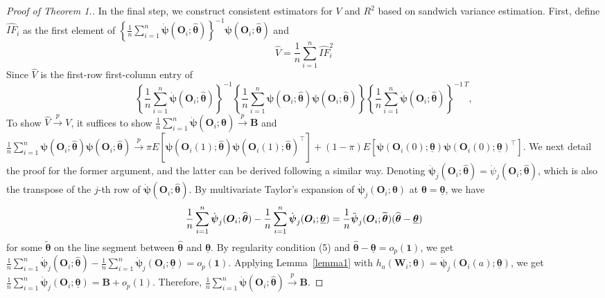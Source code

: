 \documentclass[12pt]{article}
\newcommand{\bO}{\boldsymbol{O}}
\newcommand{\bW}{\boldsymbol{W}}
\newcommand{\bone}{\boldsymbol{1}}
\newcommand{\btheta}{\boldsymbol{\theta}}
\newcommand{\bpsi}{\boldsymbol{\psi}}
\newcommand{\bfB}{\mathbf{B}}
\begin{document}
\begin{proof}[Proof of Theorem 1.]
In the final step, we construct consistent estimators for $V$ and $R^2$ based on sandwich variance estimation. First, define $\widehat{IF}_i$ as the first element of $\left\{ \frac{1}{n}\sum_{i=1}^n \dot{\bpsi}(\bO_i; \widehat{\btheta}) \right\}^{-1} \bpsi(\bO_i; \widehat{\btheta})$ and
\begin{equation}\label{def: vhat}
    \widehat{V} = \frac{1}{n}\sum_{i=1}^n \widehat{IF}_i^2
\end{equation}
Since $\widehat{V}$ is the first-row first-column entry of 
\begin{equation*}
   \left\{ \frac{1}{n}\sum_{i=1}^n \dot{\bpsi}(\bO_i; \widehat{\btheta}) \right\}^{-1} \left\{\frac{1}{n}\sum_{i=1}^n \bpsi(\bO_i; \widehat{\btheta})\bpsi(\bO_i; \widehat{\btheta})\right\}\left\{ \frac{1}{n}\sum_{i=1}^n \dot{\bpsi}(\bO_i; \widehat{\btheta}) \right\}^{-1\ T},
\end{equation*}
To show $\widehat{V} \xrightarrow{p} V$, it suffices to show $\frac{1}{n}\sum_{i=1}^n \dot{\bpsi}(\bO_i; \widehat{\btheta}) \xrightarrow{p} \bfB$ and $\frac{1}{n}\sum_{i=1}^n \bpsi(\bO_i; \widehat{\btheta})\bpsi(\bO_i; \widehat{\btheta}) \xrightarrow{p} \pi E[\bpsi(\bO_i(1); \widehat{\btheta})\bpsi(\bO_i(1); \widehat{\btheta})^\top] + (1-\pi)E[\bpsi(\bO_i(0); \underline{\btheta})\bpsi(\bO_i(0); \underline{\btheta})^\top]$. We next detail the proof for the former argument, and the latter can be derived following a similar way. Denoting $\dot{\bpsi}_{j}(\bO_i;  \widehat{\btheta}) = \dot{\psi}_j(\bO_i;  \widehat{\btheta})$, which is also the transpose of the $j$-th row of $\dot{\bpsi}(\bO_i;  \widehat{\btheta})$. By multivariate Taylor's expansion of $\dot{\bpsi}_{j}(\bO_i;  {\btheta})$ at $\btheta = \underline{\btheta}$, we have
\begin{align*}
    \frac{1}{n} \sum_{i=1}^n \dot{\bpsi}_{j}(\bO_i;  \widehat{\btheta}) - \frac{1}{n} \sum_{i=1}^n \dot{\bpsi}_{j}(\bO_i; \underline{\btheta}) = \frac{1}{n} \Ddot{\bpsi}_j(\bO_i; \widetilde{\btheta}) (\widehat{\btheta}- \underline{\btheta})
\end{align*}
for some $\widetilde{\btheta}$ on the line segment between $\widehat{\btheta}$ and $\underline{\btheta}$. By regularity condition (5) and $\widehat{\btheta}- \underline{\btheta} = o_p(\bone)$, we get $\frac{1}{n} \sum_{i=1}^n \dot{\bpsi}_{j}(\bO_i;  \widehat{\btheta}) - \frac{1}{n} \sum_{i=1}^n \dot{\bpsi}_{j}(\bO_i; \underline{\btheta}) = o_p(\bone)$. Applying Lemma~\ref{lemma1} with $h_a(\bW_i;\btheta) =  \dot{\bpsi}_{j}(\bO_i(a); \underline{\btheta})$, we get $\frac{1}{n} \sum_{i=1}^n \dot{\bpsi}_{j}(\bO_i; \underline{\btheta}) = \bfB + o_p(1)$. Therefore, $\frac{1}{n}\sum_{i=1}^n \dot{\bpsi}(\bO_i; \widehat{\btheta}) \xrightarrow{p} \bfB$. 


\end{proof}
\end{document}
